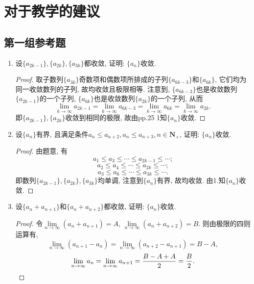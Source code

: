 \documentclass[a4paper,11pt,twoside]{ctexbook}
\begin{document}
\section{对于教学的建议}
\subsection{第一组参考题}
\begin{enumerate}
	\item 设$\{a_{2k-1}\}, \{a_{2k}\}, \{a_{3k}\}$都收敛, 证明: $\{a_n\}$收敛.
	      \begin{proof}
		      取子数列$\{a_{3k}\}$奇数项和偶数项所排成的子列$\{a_{6k-3}\}$和$\{a_{6k}\}$, 它们均为同一收敛数列的子列, 故均收敛且极限相等. 注意到, $\{a_{6k-3}\}$也是收敛数列$\{a_{2k-1}\}$的一个子列, $\{a_{6k}\}$也是收敛数列$\{a_{2k}\}$的一个子列, 从而
		      \[
			      \lim\limits_{k\to\infty} a_{2k-1}=\lim\limits_{k\to\infty} a_{6k-3}=\lim\limits_{k\to\infty} a_{6k}=\lim\limits_{k\to\infty} a_{2k}.
		      \]
		      即$\{a_{2k-1}\}, \{a_{2k}\}$收敛到相同的极限, 故由pp.25 1知$\{a_n\}$收敛. \qedhere
	      \end{proof}

	\item 设$\{a_n\}$有界, 且满足条件$a_n\leqslant a_{n+2}, a_n\leqslant a_{n+3}, n\in\mathbf{N}_{+}$, 证明: $\{a_n\}$收敛.
	      \begin{proof}
		      由题意, 有
		      \[
			      a_1\leqslant a_3\leqslant\cdots\leqslant a_{2k-1}\leqslant\cdots;
		      \]
		      \[
			      a_2\leqslant a_4\leqslant\cdots\leqslant a_{2k}\leqslant\cdots;
		      \]
		      \[
			      a_3\leqslant a_6\leqslant\cdots\leqslant a_{3k}\leqslant\cdots.
		      \]
		      即数列$\{a_{2k-1}\}, \{a_{2k}\}, \{a_{3k}\}$均单调, 注意到$\{a_n\}$有界, 故均收敛. 由1.知$\{a_n\}$收敛.\qedhere
	      \end{proof}

	\item 设$\{a_n+a_{n+1}\}$和$\{a_n+a_{n+2}\}$都收敛, 证明: $\{a_n\}$收敛.
	      \begin{proof}
		      令$\lim\limits_{n\to\infty} (a_n+a_{n+1})=A$, $\lim\limits_{n\to\infty} (a_n+a_{n+2})=B$. 则由极限的四则运算有,
		      \[
			      \lim\limits_{n\to\infty} (a_{n+1}-a_{n})=\lim\limits_{n\to\infty} (a_{n+2}-a_{n+1})=B-A,
		      \]
		      \[
			      \lim\limits_{n\to\infty} a_n=\lim\limits_{n\to\infty} a_{n+1}=\dfrac{B-A+A}{2}=\dfrac{B}{2}.\qedhere
		      \]
	      \end{proof}


\end{enumerate}
\end{document}
